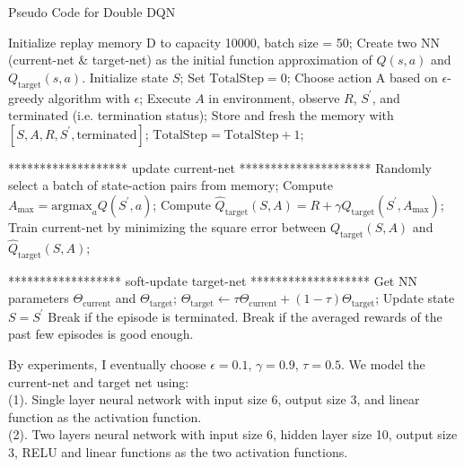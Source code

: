 \documentclass[11pt]{article}
\begin{document}
\begin{algorithm}[H]
\caption{Pseudo Code for Double DQN}
\begin{algorithmic} [1]
\STATE Initialize replay memory D to capacity 10000, batch size = 50; 
\STATE Create two NN (current-net \& target-net) as the initial function approximation of $Q(s, a)$ and $Q_{\mathrm{target}}(s, a)$.
    \STATE Initialize state $S$;
    \STATE Set $\mathrm{TotalStep} = 0$;
    \STATE Choose action A based on $\epsilon$-greedy algorithm with $\epsilon$;
    \STATE Execute $A$ in environment, observe $R$, $S^{'}$, and $\mathrm{terminated}$ (i.e. termination status);
    \STATE Store and fresh the memory with $[S, A, R, S^{'}, \mathrm{terminated}]$;
    \STATE $\mathrm{TotalStep} = \mathrm{TotalStep}+1$;
    
    ******************* update current-net *********************
    \STATE Randomly select a batch of state-action pairs from memory;
      \STATE Compute $A_{\max} = \mathrm{argmax}_a Q(S^{'}, a)$;
      \STATE Compute $\hat{Q}_{\mathrm{target}}(S, A) = R + \gamma Q_{\mathrm{target}}(S^{'}, A_{\max})$;
      \STATE Train current-net by minimizing the square error between $Q_{\mathrm{target}}(S,A)$ and $\hat{Q}_{\mathrm{target}}(S,A)$;
    \ENDFOR
    \ENDIF
    
    ****************** soft-update target-net *******************
    \STATE Get NN parameters $\Theta_{\mathrm{current}}$ and $\Theta_{\mathrm{target}}$;
    \STATE $\Theta_{\mathrm{target}} \leftarrow \tau \Theta_{\mathrm{current}} + (1 - \tau) \Theta_{\mathrm{target}}$;
    \ENDIF
    \STATE Update state $S = S^{'}$
    \STATE Break if the episode is terminated.
    \ENDFOR
    \STATE Break if the averaged rewards of the past few episodes is good enough.
\ENDFOR


\end{algorithmic}
\end{algorithm}



By experiments, I eventually choose $\epsilon = 0.1$, $\gamma = 0.9$, $\tau = 0.5$. We model the current-net and target net using:  \\
(1). Single layer neural network with input size 6, output size 3, and linear function as the activation function.  \\
(2). Two layers neural network with input size 6, hidden layer size 10, output size 3, RELU and linear functions as the two activation functions. 
\end{document}

